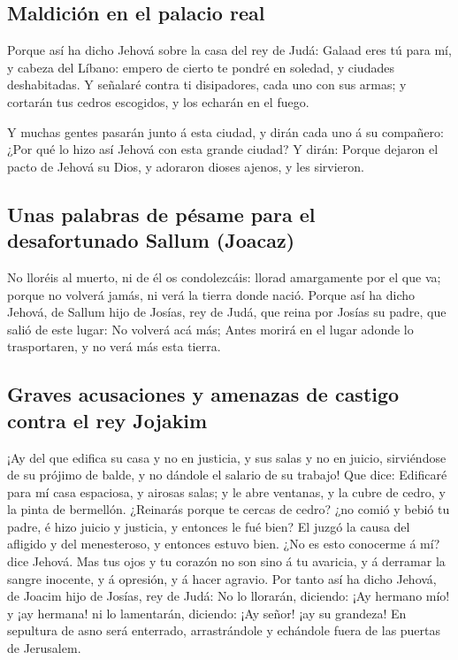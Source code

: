 \hypertarget{maldiciuxf3n-en-el-palacio-real}{%
\subsection{Maldición en el palacio
real}\label{maldiciuxf3n-en-el-palacio-real}}

 Porque así ha dicho Jehová sobre la casa del rey de Judá:
Galaad eres tú para mí, y cabeza del Líbano: empero de cierto te pondré
en soledad, y ciudades deshabitadas.  Y señalaré contra ti
disipadores, cada uno con sus armas; y cortarán tus cedros escogidos, y
los echarán en el fuego.

 Y muchas gentes pasarán junto á esta ciudad, y dirán cada
uno á su compañero: ¿Por qué lo hizo así Jehová con esta grande ciudad?
 Y dirán: Porque dejaron el pacto de Jehová su Dios, y
adoraron dioses ajenos, y les sirvieron.

\hypertarget{unas-palabras-de-puxe9same-para-el-desafortunado-sallum-joacaz}{%
\subsection{Unas palabras de pésame para el desafortunado Sallum
(Joacaz)}\label{unas-palabras-de-puxe9same-para-el-desafortunado-sallum-joacaz}}

 No lloréis al muerto, ni de él os condolezcáis: llorad
amargamente por el que va; porque no volverá jamás, ni verá la tierra
donde nació.  Porque así ha dicho Jehová, de Sallum hijo de
Josías, rey de Judá, que reina por Josías su padre, que salió de este
lugar: No volverá acá más;  Antes morirá en el lugar adonde
lo trasportaren, y no verá más esta tierra.

\hypertarget{graves-acusaciones-y-amenazas-de-castigo-contra-el-rey-jojakim}{%
\subsection{Graves acusaciones y amenazas de castigo contra el rey
Jojakim}\label{graves-acusaciones-y-amenazas-de-castigo-contra-el-rey-jojakim}}

 ¡Ay del que edifica su casa y no en justicia, y sus salas
y no en juicio, sirviéndose de su prójimo de balde, y no dándole el
salario de su trabajo!  Que dice: Edificaré para mí casa
espaciosa, y airosas salas; y le abre ventanas, y la cubre de cedro, y
la pinta de bermellón.  ¿Reinarás porque te cercas de
cedro? ¿no comió y bebió tu padre, é hizo juicio y justicia, y entonces
le fué bien?  El juzgó la causa del afligido y del
menesteroso, y entonces estuvo bien. ¿No es esto conocerme á mí? dice
Jehová.  Mas tus ojos y tu corazón no son sino á tu
avaricia, y á derramar la sangre inocente, y á opresión, y á hacer
agravio.  Por tanto así ha dicho Jehová, de Joacim hijo de
Josías, rey de Judá: No lo llorarán, diciendo: ¡Ay hermano mío! y ¡ay
hermana! ni lo lamentarán, diciendo: ¡Ay señor! ¡ay su grandeza!
 En sepultura de asno será enterrado, arrastrándole y
echándole fuera de las puertas de Jerusalem.

